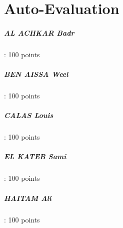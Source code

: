\chapter{Auto-Evaluation}

\paragraph{AL ACHKAR Badr}: 100 points
\paragraph{BEN AISSA Weel}: 100 points
\paragraph{CALAS Louis}: 100 points
\paragraph{EL KATEB Sami}: 100 points
\paragraph{HAITAM Ali}: 100 points

